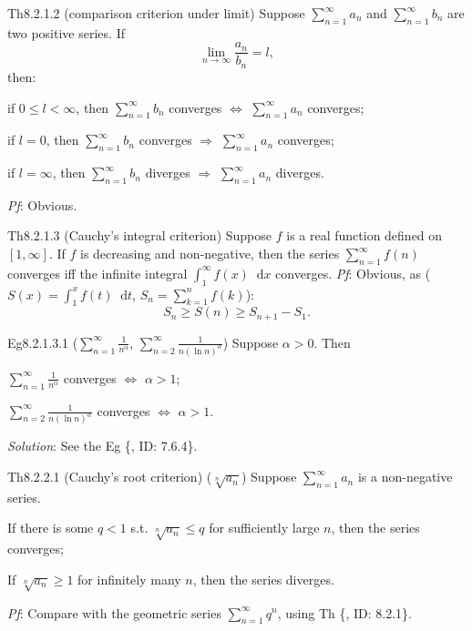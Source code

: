 \documentclass{article}
\newcommand{\dif}{\mathop{}\!\mathrm{d}}
\begin{document}
\begin{Th}{Th8.2.1.2 (comparison criterion under limit)}
    Suppose $\sum_{n=1}^{\infty} a_n$ and $\sum_{n=1}^{\infty} b_n$ are two positive series. If
    $$ \lim_{n\to\infty} \frac{a_n}{b_n} = l, $$
    then:
    \begin{compactitem}
        \item if $0\leq l < \infty$, then $\sum_{n=1}^{\infty} b_n$ converges $\Leftrightarrow$ $\sum_{n=1}^{\infty} a_n$ converges;
        \item if $l = 0$, then $\sum_{n=1}^{\infty} b_n$ converges $\Rightarrow$ $\sum_{n=1}^{\infty} a_n$ converges;
        \item if $l = \infty$, then $\sum_{n=1}^{\infty} b_n$ diverges $\Rightarrow$ $\sum_{n=1}^{\infty} a_n$ diverges.
    \end{compactitem}
    \tcblower
    \textit{Pf}: Obvious.
\end{Th}

\begin{Th}{Th8.2.1.3 (Cauchy's integral criterion)}
    Suppose $f$ is a real function defined on $[1, \infty]$. If $f$ is decreasing and non-negative, then the series $\sum_{n=1}^{\infty} f(n)$ converges iff the infinite integral $\int_{1}^{\infty} f(x)\dif x$ converges.
    \tcblower
    \tcblower
    \textit{Pf}: Obvious, as ($S(x) = \int_{1}^{x} f(t)\dif t$, $S_n = \sum_{k=1}^{n} f(k)$):
    $$ S_n \geq S(n) \geq S_{n+1}-S_1. $$
\end{Th}

\begin{Th}{Eg8.2.1.3.1 ($\sum_{n=1}^{\infty} \frac{1}{n^\alpha}$, $\sum_{n=2}^{\infty} \frac{1}{n(\ln n)^\alpha}$)}
    Suppose $\alpha>0$. Then
    \begin{compactenum}
        \item $\sum_{n=1}^{\infty} \frac{1}{n^\alpha}$ converges $\Leftrightarrow$ $\alpha>1$;
        \item $\sum_{n=2}^{\infty} \frac{1}{n(\ln n)^\alpha}$ converges $\Leftrightarrow$ $\alpha>1$.
    \end{compactenum}
    \tcblower
    \textit{Solution}: See the Eg \{, ID: 7.6.4\}.
\end{Th}

\begin{Th}{Th8.2.2.1 (Cauchy's root criterion) ($\sqrt[n]{a_n}$)}
    Suppose $\sum_{n=1}^{\infty} a_n$ is a non-negative series. 
    \begin{compactenum}
        \item If there is some $q<1$ s.t. $\sqrt[n]{a_n} \leq q$ for sufficiently large $n$, then the series converges;
        \item If $\sqrt[n]{a_n} \geq 1$ for infinitely many $n$, then the series diverges.
    \end{compactenum}
    \tcblower
    \textit{Pf}: Compare with the geometric series $\sum_{n=1}^{\infty} q^{n}$, using Th \{, ID: 8.2.1\}.
\end{Th}
\end{document}
